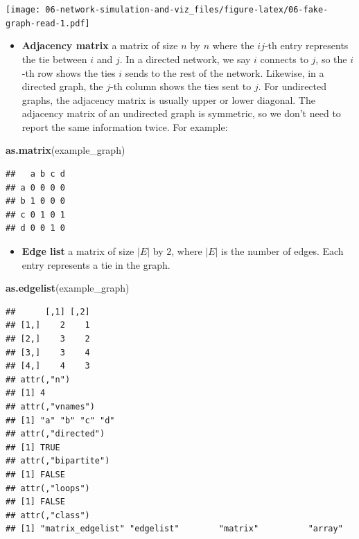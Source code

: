 \documentclass[]{book}
\newenvironment{Shaded}{\begin{snugshade}}{\end{snugshade}}
\newcommand{\KeywordTok}[1]{\textcolor[rgb]{0.13,0.29,0.53}{\textbf{#1}}}
\newcommand{\NormalTok}[1]{#1}
\providecommand{\tightlist}{%
  \setlength{\itemsep}{0pt}\setlength{\parskip}{0pt}}
\begin{document}
\texttt{[image: 06-network-simulation-and-viz\_files/figure-latex/06-fake-graph-read-1.pdf]}

\begin{itemize}
\tightlist
\item
  \textbf{Adjacency matrix} a matrix of size \(n\) by \(n\) where the \(ij\)-th entry represents
  the tie between \(i\) and \(j\). In a directed network, we say \(i\) connects to \(j\),
  so the \(i\)-th row shows the ties \(i\) sends to the rest of the network. Likewise,
  in a directed graph, the \(j\)-th column shows the ties sent to \(j\). For undirected
  graphs, the adjacency matrix is usually upper or lower diagonal. The adjacency
  matrix of an undirected graph is symmetric, so we don't need to report the same
  information twice. For example:
\end{itemize}

\begin{Shaded}
\begin{Highlighting}[]
\KeywordTok{as.matrix}\NormalTok{(example_graph)}
\end{Highlighting}
\end{Shaded}

\begin{verbatim}
##   a b c d
## a 0 0 0 0
## b 1 0 0 0
## c 0 1 0 1
## d 0 0 1 0
\end{verbatim}

\begin{itemize}
\tightlist
\item
  \textbf{Edge list} a matrix of size \(|E|\) by \(2\), where \(|E|\) is the number of edges.
  Each entry represents a tie in the graph.
\end{itemize}

\begin{Shaded}
\begin{Highlighting}[]
\KeywordTok{as.edgelist}\NormalTok{(example_graph)}
\end{Highlighting}
\end{Shaded}

\begin{verbatim}
##      [,1] [,2]
## [1,]    2    1
## [2,]    3    2
## [3,]    3    4
## [4,]    4    3
## attr(,"n")
## [1] 4
## attr(,"vnames")
## [1] "a" "b" "c" "d"
## attr(,"directed")
## [1] TRUE
## attr(,"bipartite")
## [1] FALSE
## attr(,"loops")
## [1] FALSE
## attr(,"class")
## [1] "matrix_edgelist" "edgelist"        "matrix"          "array"
\end{verbatim}
\end{document}
